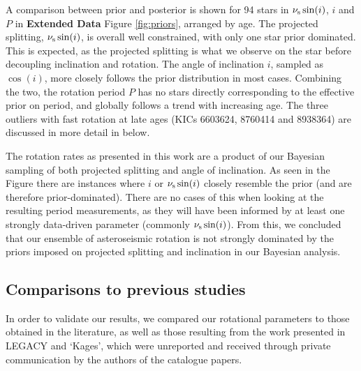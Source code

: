 A comparison between prior and posterior is shown for 94 stars in $\nu_{\rm s}\sin(i)$, $i$ and $P$ in \textbf{Extended Data} Figure \ref{fig:priors}, arranged by age.  The projected splitting, $\nu_{\rm s}\sin(i)$, is overall well constrained, with only one star  prior dominated. This is expected, as the projected splitting is what we observe on the star before decoupling inclination and rotation. The angle of inclination $i$, sampled as $\cos(i)$, more closely follows the prior distribution in most cases. Combining the two, the rotation period $P$ has no stars directly corresponding to the effective prior on period, and globally follows a trend with increasing age. The three outliers with fast rotation at late ages (KICs 6603624, 8760414 and 8938364) are discussed in more detail in below.

The rotation rates as presented in this work are a product of our Bayesian sampling of both projected splitting and angle of inclination. As seen in the Figure there are instances where $i$ or $\nu_{\rm s}\sin(i)$ closely resemble the prior (and are therefore prior-dominated). There are no cases of this when looking at the resulting period measurements, as they will have been informed by at least one strongly data-driven parameter (commonly $\nu_{\rm s}\sin(i)$). From this, we concluded that our ensemble of asteroseismic rotation is not strongly dominated by the priors imposed on projected splitting and inclination in our Bayesian analysis.

\subsection{Comparisons to previous studies}\label{ssec:litcomp}
In order to validate our results, we compared our rotational parameters to those obtained in the literature, as well as those resulting from the work presented in LEGACY and `Kages', which were unreported and received through private communication by the authors of the catalogue papers.

